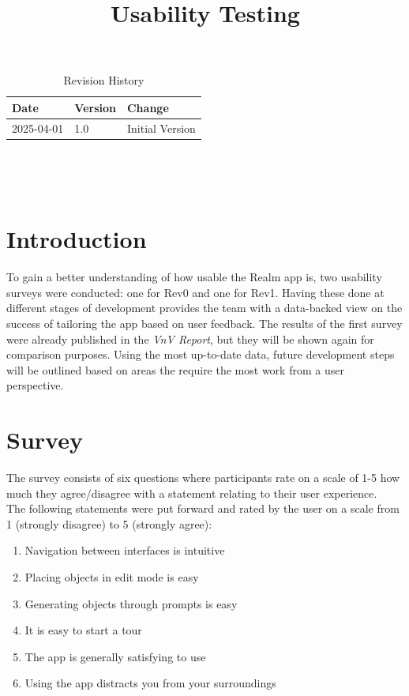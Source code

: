 \documentclass{article}
\title{Usability Testing\\\progname}
\author{\authname}
\date{}
\begin{document}
\maketitle

\newpage

\begin{table}[hp]
\caption{Revision History} \label{TblRevisionHistory}
\begin{tabularx}{\textwidth}{llX}
\toprule
\textbf{Date} & \textbf{Version} & \textbf{Change}\\
\midrule
2025-04-01 & 1.0 & Initial Version \\
\bottomrule
\end{tabularx}
\end{table}

~\newpage

\tableofcontents

~\newpage


\section{Introduction}

To gain a better understanding of how usable the Realm app is, two usability surveys were conducted: one for Rev0 and one for Rev1. Having these done at different stages of development provides the team with a data-backed view on the success of tailoring the app based on user feedback. The results of the first survey were already published in the \textit{VnV Report}, but they will be shown again for comparison purposes. Using the most up-to-date data, future development steps will be outlined based on areas the require the most work from a user perspective.

\section{Survey}
The survey consists of six questions where participants rate on a scale of 1-5 how much they agree/disagree with a statement relating to their user experience. \\

\noindent The following statements were put forward and rated by the user on a scale from 1 (strongly disagree) to 5 (strongly agree):
\begin{enumerate}
    \item Navigation between interfaces is intuitive
    \item Placing objects in edit mode is easy
    \item Generating objects through prompts is easy
    \item It is easy to start a tour
    \item The app is generally satisfying to use
    \item Using the app distracts you from your surroundings
\end{enumerate}
\end{document}
